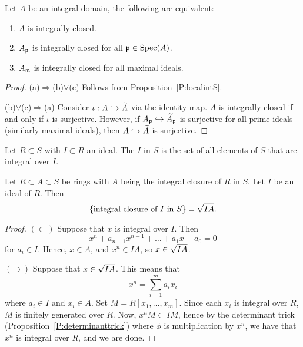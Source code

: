 \documentclass{ximera}
\begin{document}
\begin{proposition}
  Let $A$ be an integral domain, the following are equivalent:
  \begin{enumerate}
  \item $A$ is integrally closed.
  \item $A_{\mathfrak{p}}$ is integrally closed for all $\mathfrak{p}\in\operatorname{Spec}(A)$.
  \item $A_{\mathfrak{m}}$ is integrally closed for all maximal ideals.
  \end{enumerate}
  \begin{proof}
    (a)$\Rightarrow$(b)$\vee$(c) Follows from Proposition~\ref{P:localintS}.

    (b)$\vee$(c)$\Rightarrow$(a) Consider $\iota: A\hookrightarrow\widetilde{A}$ via
    the identity map. $A$ is integrally closed if and only if $\iota$
    is surjective. However, if $A_{\mathfrak{p}}\hookrightarrow\widetilde{A}_{\mathfrak{p}}$ is surjective
    for all prime ideals (similarly maximal ideals), then
    $A\hookrightarrow\widetilde{A}$ is surjective.
  \end{proof}
\end{proposition}


\begin{definition}
   Let $R\subset S$ with $I\subset R$ an ideal. The  $I$ in $S$ is the set of all elements of $S$
   that are integral over $I$.
\end{definition}


\begin{proposition}\label{P:intideal}
  Let $R\subset A\subset S$ be rings with $A$ being the integral
  closure of $R$ in $S$. Let $I$ be an ideal of $R$. Then
  \[
  \{\text{integral closure of $I$ in $S$}\} = \sqrt{IA}.
  \]
  \begin{proof}
    $(\subset)$ Suppose that $x$ is integral over $I$. Then
    \[
    x^n + a_{n-1}x^{n-1} + \dots + a_1 x + a_0 = 0
    \]
    for $a_i\in I$. Hence, $x\in A$, and $x^n\in IA$, so $x\in
    \sqrt{IA}$.

    $(\supset)$ Suppose that $x\in\sqrt{IA}$. This means that
    \[
    x^n = \sum_{i=1}^m a_i x_i
    \]
    where $a_i\in I$ and $x_i\in A$. Set $M = R[x_1,\dots,
      x_m]$. Since each $x_i$ is integral over $R$, $M$ is finitely
    generated over $R$. Now, $x^n M \subset I M$, hence by the
    determinant trick (Proposition~\ref{P:determinanttrick}) where
    $\phi$ is multiplication by $x^n$, we have that $x^n$ is integral
    over $R$, and we are done.
  \end{proof}
\end{proposition}
\end{document}
